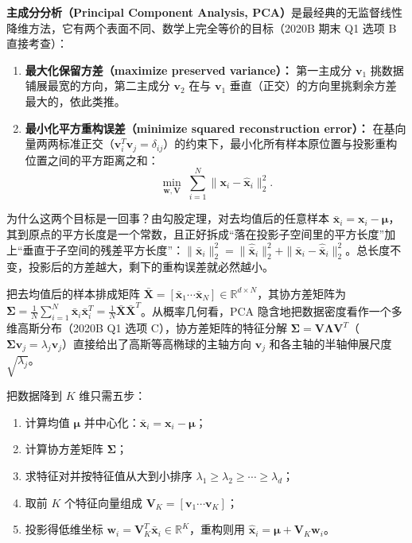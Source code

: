 \textbf{主成分分析（Principal Component Analysis, PCA）}是最经典的无监督线性降维方法，它有两个表面不同、数学上完全等价的目标（2020B 期末 Q1 选项 B 直接考查）：
\begin{enumerate}
\item \textbf{最大化保留方差（maximize preserved variance）：} 第一主成分 $\mathbf{v}_1$ 挑数据铺展最宽的方向，第二主成分 $\mathbf{v}_2$ 在与 $\mathbf{v}_1$ 垂直（正交）的方向里挑剩余方差最大的，依此类推。
\item \textbf{最小化平方重构误差（minimize squared reconstruction error）：} 在基向量两两标准正交（$\mathbf{v}_i^T\mathbf{v}_j = \delta_{ij}$）的约束下，最小化所有样本原位置与投影重构位置之间的平方距离之和：
\[
\min_{\mathbf{w},\mathbf{V}}\;\sum_{i=1}^N \|\mathbf{x}_i - \hat{\mathbf{x}}_i\|_2^2.
\tag{8.2}
\]
\end{enumerate}
为什么这两个目标是一回事？由勾股定理，对去均值后的任意样本 $\bar{\mathbf{x}}_i = \mathbf{x}_i - \boldsymbol{\mu}$，其到原点的平方长度是一个常数，且正好拆成“落在投影子空间里的平方长度”加上“垂直于子空间的残差平方长度”：$\|\bar{\mathbf{x}}_i\|_2^2 = \|\hat{\bar{\mathbf{x}}}_i\|_2^2 + \|\bar{\mathbf{x}}_i - \hat{\bar{\mathbf{x}}}_i\|_2^2$。总长度不变，投影后的方差越大，剩下的重构误差就必然越小。


把去均值后的样本排成矩阵 $\bar{\mathbf{X}} = [\bar{\mathbf{x}}_1 \cdots \bar{\mathbf{x}}_N] \in \mathbb{R}^{d\times N}$，其协方差矩阵为 $\boldsymbol{\Sigma} = \frac{1}{N}\sum_{i=1}^N \bar{\mathbf{x}}_i\bar{\mathbf{x}}_i^T = \frac{1}{N}\bar{\mathbf{X}}\bar{\mathbf{X}}^T$。从概率几何看，PCA 隐含地把数据密度看作一个多维高斯分布（2020B Q1 选项 C），协方差矩阵的特征分解 $\boldsymbol{\Sigma} = \mathbf{V}\boldsymbol{\Lambda}\mathbf{V}^T$（$\boldsymbol{\Sigma}\mathbf{v}_j = \lambda_j \mathbf{v}_j$）直接给出了高斯等高椭球的主轴方向 $\mathbf{v}_j$ 和各主轴的半轴伸展尺度 $\sqrt{\lambda_j}$。

把数据降到 $K$ 维只需五步：
\begin{enumerate}
\item 计算均值 $\boldsymbol{\mu}$ 并中心化：$\bar{\mathbf{x}}_i = \mathbf{x}_i - \boldsymbol{\mu}$；
\item 计算协方差矩阵 $\boldsymbol{\Sigma}$；
\item 求特征对并按特征值从大到小排序 $\lambda_1 \ge \lambda_2 \ge \cdots \ge \lambda_d$；
\item 取前 $K$ 个特征向量组成 $\mathbf{V}_K = [\mathbf{v}_1 \cdots \mathbf{v}_K]$；
\item 投影得低维坐标 $\mathbf{w}_i = \mathbf{V}_K^T \bar{\mathbf{x}}_i \in \mathbb{R}^K$，重构则用 $\hat{\mathbf{x}}_i = \boldsymbol{\mu} + \mathbf{V}_K\mathbf{w}_i$。
\end{enumerate}

